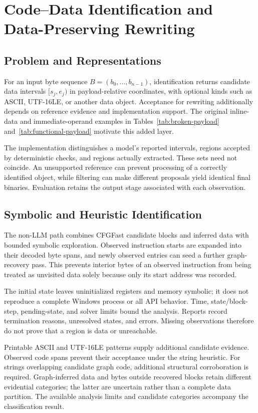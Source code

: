 \section{Code--Data Identification and Data-Preserving Rewriting}
\label{sec:code_data}
\subsection{Problem and Representations}
For an input byte sequence $B=(b_0,\ldots,b_{n-1})$, identification
returns candidate data intervals $[s_j,e_j)$ in payload-relative
coordinates, with optional kinds such as ASCII, UTF-16LE, or another
data object. Acceptance for rewriting additionally depends on reference
evidence and implementation support. The original inline-data and
immediate-operand examples in Tables~\ref{tab:broken-payload}
and~\ref{tab:functional-payload} motivate this added layer.

The implementation distinguishes a model's reported intervals, regions
accepted by deterministic checks, and regions actually extracted.
These sets need not coincide. An unsupported reference can prevent
processing of a correctly identified object, while filtering can make
different proposals yield identical final binaries. Evaluation retains
the output stage associated with each observation.

\subsection{Symbolic and Heuristic Identification}
The non-LLM path combines CFGFast candidate blocks and inferred data
with bounded symbolic exploration. Observed instruction starts are
expanded into their decoded byte spans, and newly observed entries
can seed a further graph-recovery pass. This prevents interior bytes
of an observed instruction from being treated as unvisited data solely
because only its start address was recorded.

The initial state leaves uninitialized registers and memory symbolic;
it does not reproduce a complete Windows process or all API behavior.
Time, state/block-step, pending-state, and solver limits bound the
analysis. Reports record termination reasons, unresolved states, and
errors. Missing observations therefore do not prove that a region is
data or unreachable.

Printable ASCII and UTF-16LE patterns supply additional candidate
evidence. Observed code spans prevent their acceptance under the
string heuristic. For strings overlapping candidate graph code,
additional structural corroboration is required. Graph-inferred
data and bytes outside recovered blocks retain different evidential
categories; the latter are uncertain rather than a complete data
partition. The available analysis limits and candidate categories
accompany the classification result.

